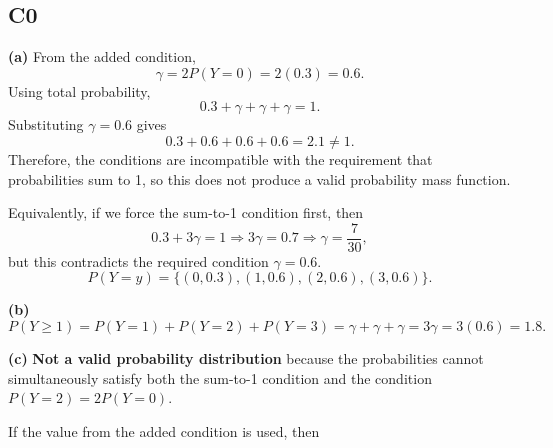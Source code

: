 		\subsection*{C0}

		\textbf{(a)} From the added condition,
		\[
		\gamma=2P(Y=0)=2(0.3)=0.6.
		\]
		Using total probability,
		\[
		0.3+\gamma+\gamma+\gamma=1.
		\]
		Substituting $\gamma=0.6$ gives
		\[
		0.3+0.6+0.6+0.6=2.1\neq 1.
		\]
		Therefore, the conditions are incompatible with the requirement that probabilities sum to 1, so this does not produce a valid probability mass function.
		
		Equivalently, if we force the sum-to-1 condition first, then
		\[
		0.3+3\gamma=1\Rightarrow 3\gamma=0.7\Rightarrow \gamma=\frac{7}{30},
		\]
		but this contradicts the required condition $\gamma=0.6$.
		\[
		P(Y=y)=\{(0,0.3),(1,0.6),(2,0.6),(3,0.6)\}.
		\]
		\begin{center}
		\end{center}
		
		

		\textbf{(b)}
		\[
		P(Y\ge 1)=P(Y=1)+P(Y=2)+P(Y=3)=\gamma+\gamma+\gamma=3\gamma=3(0.6)=1.8.
		\]
		\begin{center}
		\end{center}
		\textbf{(c)} \textbf{Not a valid probability distribution} because the probabilities cannot simultaneously satisfy both the sum-to-1 condition and the condition $P(Y=2)=2P(Y=0)$.
		
		If the value from the added condition is used, then

